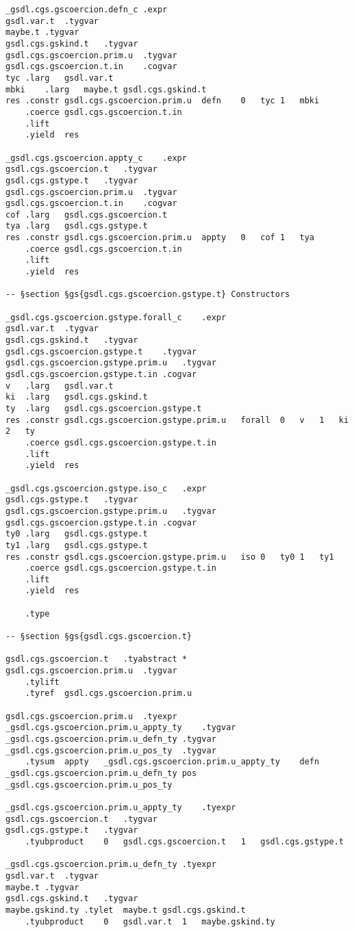 \documentclass{report}
\begin{document}
\begin{verbatim}
_gsdl.cgs.gscoercion.defn_c	.expr
gsdl.var.t	.tygvar
maybe.t	.tygvar
gsdl.cgs.gskind.t	.tygvar
gsdl.cgs.gscoercion.prim.u	.tygvar
gsdl.cgs.gscoercion.t.in	.cogvar
tyc	.larg	gsdl.var.t
mbki	.larg	maybe.t	gsdl.cgs.gskind.t
res	.constr	gsdl.cgs.gscoercion.prim.u	defn	0	tyc	1	mbki
	.coerce	gsdl.cgs.gscoercion.t.in
	.lift
	.yield	res

_gsdl.cgs.gscoercion.appty_c	.expr
gsdl.cgs.gscoercion.t	.tygvar
gsdl.cgs.gstype.t	.tygvar
gsdl.cgs.gscoercion.prim.u	.tygvar
gsdl.cgs.gscoercion.t.in	.cogvar
cof	.larg	gsdl.cgs.gscoercion.t
tya	.larg	gsdl.cgs.gstype.t
res	.constr	gsdl.cgs.gscoercion.prim.u	appty	0	cof	1	tya
	.coerce	gsdl.cgs.gscoercion.t.in
	.lift
	.yield	res

-- §section §gs{gsdl.cgs.gscoercion.gstype.t} Constructors

_gsdl.cgs.gscoercion.gstype.forall_c	.expr
gsdl.var.t	.tygvar
gsdl.cgs.gskind.t	.tygvar
gsdl.cgs.gscoercion.gstype.t	.tygvar
gsdl.cgs.gscoercion.gstype.prim.u	.tygvar
gsdl.cgs.gscoercion.gstype.t.in	.cogvar
v	.larg	gsdl.var.t
ki	.larg	gsdl.cgs.gskind.t
ty	.larg	gsdl.cgs.gscoercion.gstype.t
res	.constr	gsdl.cgs.gscoercion.gstype.prim.u	forall	0	v	1	ki	2	ty
	.coerce	gsdl.cgs.gscoercion.gstype.t.in
	.lift
	.yield	res

_gsdl.cgs.gscoercion.gstype.iso_c	.expr
gsdl.cgs.gstype.t	.tygvar
gsdl.cgs.gscoercion.gstype.prim.u	.tygvar
gsdl.cgs.gscoercion.gstype.t.in	.cogvar
ty0	.larg	gsdl.cgs.gstype.t
ty1	.larg	gsdl.cgs.gstype.t
res	.constr	gsdl.cgs.gscoercion.gstype.prim.u	iso	0	ty0	1	ty1
	.coerce	gsdl.cgs.gscoercion.gstype.t.in
	.lift
	.yield	res

	.type

-- §section §gs{gsdl.cgs.gscoercion.t}

gsdl.cgs.gscoercion.t	.tyabstract	*
gsdl.cgs.gscoercion.prim.u	.tygvar
	.tylift
	.tyref	gsdl.cgs.gscoercion.prim.u

gsdl.cgs.gscoercion.prim.u	.tyexpr
_gsdl.cgs.gscoercion.prim.u_appty_ty	.tygvar
_gsdl.cgs.gscoercion.prim.u_defn_ty	.tygvar
_gsdl.cgs.gscoercion.prim.u_pos_ty	.tygvar
	.tysum	appty	_gsdl.cgs.gscoercion.prim.u_appty_ty	defn	_gsdl.cgs.gscoercion.prim.u_defn_ty	pos	_gsdl.cgs.gscoercion.prim.u_pos_ty

_gsdl.cgs.gscoercion.prim.u_appty_ty	.tyexpr
gsdl.cgs.gscoercion.t	.tygvar
gsdl.cgs.gstype.t	.tygvar
	.tyubproduct	0	gsdl.cgs.gscoercion.t	1	gsdl.cgs.gstype.t

_gsdl.cgs.gscoercion.prim.u_defn_ty	.tyexpr
gsdl.var.t	.tygvar
maybe.t	.tygvar
gsdl.cgs.gskind.t	.tygvar
maybe.gskind.ty	.tylet	maybe.t	gsdl.cgs.gskind.t
	.tyubproduct	0	gsdl.var.t	1	maybe.gskind.ty


\end{verbatim}
\end{document}
